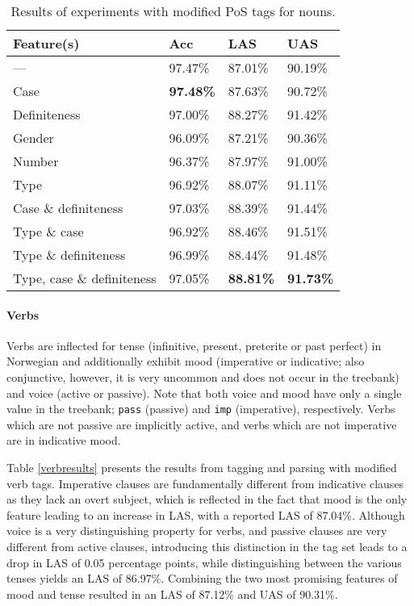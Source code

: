 \documentclass[11pt,a4paper]{article}
\begin{document}
\begin{table}
    \centering
    \smaller[1]
    \begin{tabular}{@{}llll@{}}
        \toprule
        \textbf{Feature(s)} & \textbf{Acc} & \textbf{LAS} & \textbf{UAS}
        \\
        \midrule
        --- & 97.47\% & 87.01\% & 90.19\% \\
        Case & \textbf{97.48\%} & 87.63\% & 90.72\% \\
        Definiteness & 97.00\% & 88.27\% & 91.42\% \\
        Gender & 96.09\% & 87.21\% & 90.36\% \\
        Number & 96.37\% & 87.97\% & 91.00\% \\
        Type & 96.92\% & 88.07\% & 91.11\% \\
        Case \& definiteness & 97.03\% & 88.39\% & 91.44\% \\
        Type \& case & 96.92\% & 88.46\% & 91.51\% \\
        Type \& definiteness & 96.99\% & 88.44\% & 91.48\% \\
        Type, case \& definiteness & 97.05\% & \textbf{88.81\%} &
        \textbf{91.73\%} \\
        \bottomrule
    \end{tabular}
    \caption{Results of experiments with modified PoS tags for nouns.}
    \label{substresults}
\end{table}

\paragraph{Verbs}
Verbs are inflected for tense (infinitive, present, preterite or past perfect)
in Norwegian and additionally exhibit mood (imperative or indicative; also
conjunctive, however, it is very uncommon and does not occur in the treebank)
and voice (active or passive). Note that both voice and mood have only a single
value in the treebank; \texttt{pass} (passive) and \texttt{imp} (imperative),
respectively. Verbs which are not passive are implicitly active, and verbs
which are not imperative are in indicative mood.

Table \ref{verbresults} presents the results from tagging and parsing with
modified verb tags. Imperative clauses are fundamentally different from
indicative clauses as they lack an overt subject, which is reflected in the
fact that mood is the only feature leading to an increase in LAS, with a
reported LAS of 87.04\%. Although voice is a very distinguishing property for
verbs, and passive clauses are very different from active clauses, introducing
this distinction in the tag set leads to a drop in LAS of 0.05 percentage
points, while distinguishing between the various tenses yields an LAS of
86.97\%. Combining the two most promising features of mood and tense resulted
in an LAS of 87.12\% and UAS of 90.31\%.
\end{document}
